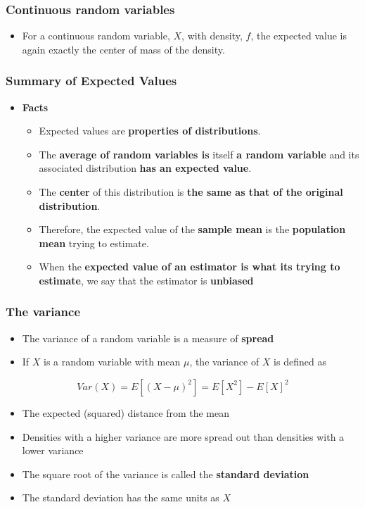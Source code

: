 \documentclass[10pt,article]{article}
\begin{document}
\subsubsection{Continuous random variables}
\label{sec:org94878cb}
\begin{itemize}
\item For a continuous random variable, \(X\), with density, \(f\), the expected value is again exactly the center of mass of the density.
\end{itemize}
\subsubsection{Summary of Expected Values}
\label{sec:org4526af8}
\begin{itemize}
\item \textbf{Facts}
\begin{itemize}
\item Expected values are \textbf{properties of distributions}.
\item The \textbf{average of random variables is} itself \textbf{a random variable} and its associated distribution \textbf{has an expected value}.
\item The \textbf{center} of this distribution is \textbf{the same as that of the original distribution}.
\item Therefore, the expected value of the \textbf{\textbf{sample mean}} is the \textbf{population mean} trying to estimate.
\item When the \textbf{expected value of an estimator is what its trying to estimate}, we say that the estimator is \textbf{\textbf{unbiased}}
\end{itemize}
\end{itemize}

\subsubsection{The variance}
\label{sec:orge85e751}

\begin{itemize}
\item The variance of a random variable is a measure of \textbf{spread}
\item If \(X\) is a random variable with mean \(\mu\), the variance of \(X\) is defined as
\end{itemize}

$$
Var(X) = E[(X - \mu)^2] = E[X^2] - E[X]^2
$$

\begin{itemize}
\item The expected (squared) distance from the mean
\item Densities with a higher variance are more spread out than densities with a lower variance
\item The square root of the variance is called the \textbf{\textbf{standard deviation}}
\item The standard deviation has the same units as \(X\)
\end{itemize}
\end{document}
